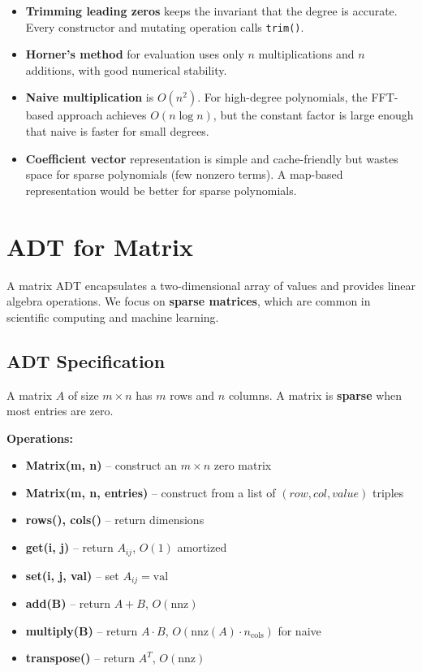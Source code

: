 \begin{itemize}
\item \textbf{Trimming leading zeros} keeps the invariant that the degree is accurate. Every constructor and mutating operation calls \texttt{trim()}.
\item \textbf{Horner's method} for evaluation uses only $n$ multiplications and $n$ additions, with good numerical stability.
\item \textbf{Naive multiplication} is $O(n^{2})$. For high-degree polynomials, the FFT-based approach achieves $O(n \log n)$, but the constant factor is large enough that naive is faster for small degrees.
\item \textbf{Coefficient vector} representation is simple and cache-friendly but wastes space for sparse polynomials (few nonzero terms). A map-based representation would be better for sparse polynomials.
\end{itemize}

\section{ADT for Matrix}

A matrix ADT encapsulates a two-dimensional array of values and provides linear algebra operations. We focus on \textbf{sparse matrices}, which are common in scientific computing and machine learning.

\subsection{ADT Specification}

A matrix $A$ of size $m \times n$ has $m$ rows and $n$ columns. A matrix is \textbf{sparse} when most entries are zero.

\textbf{Operations:}
\begin{itemize}
\item \textbf{Matrix(m, n)} -- construct an $m \times n$ zero matrix
\item \textbf{Matrix(m, n, entries)} -- construct from a list of $(row, col, value)$ triples
\item \textbf{rows(), cols()} -- return dimensions
\item \textbf{get(i, j)} -- return $A_{ij}$, $O(1)$ amortized
\item \textbf{set(i, j, val)} -- set $A_{ij} = \text{val}$
\item \textbf{add(B)} -- return $A + B$, $O(\text{nnz})$
\item \textbf{multiply(B)} -- return $A \cdot B$, $O(\text{nnz}(A) \cdot n_{\text{cols}})$ for naive
\item \textbf{transpose()} -- return $A^{T}$, $O(\text{nnz})$
\end{itemize}

